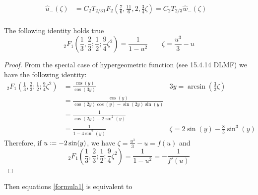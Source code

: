 \documentclass[11pt,a4paper,twoside,leqno,noamsfonts]{amsart}
\numberwithin{equation}{section}
\begin{document}
\begin{example}[Airy]
\begin{align*}
\hat{u}_-(\zeta)&= C_2 T_{2/3} {}_{1}F_{2}\left(\frac{7}{6},\frac{11}{6},2,\frac{3}{4}\zeta\right)= C_2 T_{2/3}\hat{w}_-(\zeta) & \\
\end{align*}
%

\begin{lemma}
The following identity holds true
\begin{equation}
{}_2F_1\left(\frac{1}{3},\frac{2}{3};\frac{1}{2};\frac{9}{4}\zeta^2\right)=\frac{1}{1-u^2}\qquad \zeta=\frac{u^3}{3}-u
\end{equation}
\end{lemma}
\begin{proof}From the special case of hypergeometric function (see 15.4.14 DLMF) we have the following identity:
\begin{align*}
{}_2F_1\left(\frac{1}{3},\frac{2}{3};\frac{1}{2};\frac{9}{4}\zeta^2\right)&=%
\frac{\cos(y)}{\cos(3y)} & 3y=\arcsin\left(\frac{3}{2}\zeta\right)\\
&=\frac{\cos(y)}{\cos(2y)\cos(y)-\sin(2y)\sin(y)} & \\
&=\frac{1}{\cos(2y)-2\sin^2(y)} & \\
&=\frac{1}{1-4\sin^2(y)} & \zeta=2\sin(y)-\frac{8}{3}\sin^3(y)
\end{align*}
Therefore, if $u\defeq -2\sin(y)$, we have $\zeta=\frac{u^3}{3}-u=f(u)$ and \[{}_2F_1\left(\frac{1}{3},\frac{2}{3};\frac{1}{2};\frac{9}{4}\zeta^2\right)=\frac{1}{1-u^2}=-\frac{1}{f'(u)}\]
\end{proof}

Then equations \eqref{formula1} is equivalent to
 

\end{example}
\end{document}
